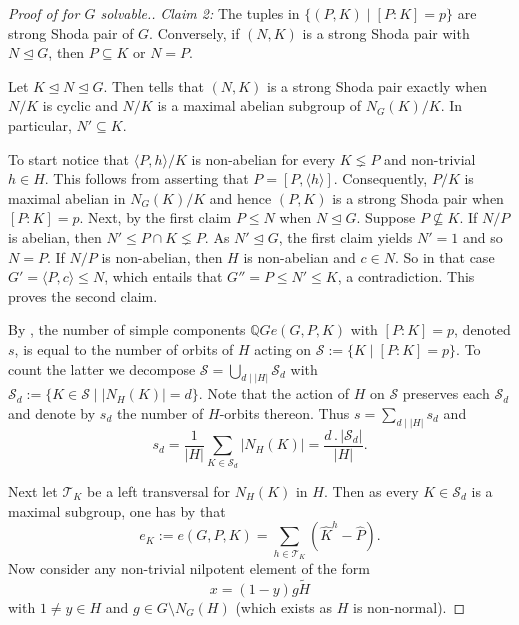 \documentclass[a4paper,10pt]{amsart}
\theoremstyle{definition}
\theoremstyle{remark}
\newcommand{\Q}{{\mathbb Q}}
\begin{document}
\begin{proof}[Proof of  for $G$ solvable.]
{\it Claim 2:} The tuples in $\{ (P, K) \mid [P:K] = p \}$ are strong Shoda pair of $G$. Conversely, if $(N,K)$ is a strong Shoda pair with $N \unlhd G$, then $P \subseteq K$ or $N=P$. \vspace{0,1cm}


\noindent Let $K \unlhd N \unlhd G$. Then \cite[Corollary 3.5.11]{GRG1} tells that $(N,K)$ is a strong Shoda pair exactly when $N/K$ is cyclic and $N/K$ is a maximal abelian subgroup of $N_G(K)/K$. In particular, $N' \subseteq K$. 

\noindent To start notice that $\langle P, h \rangle /K$ is non-abelian for every $K \lneq P$ and non-trivial $h \in H$. This follows from \cite[(24.6), pg 112]{Aschbacher} asserting that  $P = [P, \langle h \rangle]$. Consequently, $P/K$ is maximal abelian in $N_G(K)/K$ and hence $(P,K)$ is a strong Shoda pair when $[P:K]=p$.  Next, by the first claim $P \leq N$ when $N \unlhd G$. Suppose $P \nsubseteq K$. If $N/P$ is abelian, then $N' \leq P \cap K \lneq P$. As $N' \unlhd G$, the first claim yields $N' = 1$ and so $N= P$. If $N/P$ is non-abelian, then $H$ is non-abelian and $c \in N$. So in that case $G' = \langle P, c \rangle  \leq N$, which entails that $G'' = P \leq N' \leq K$, a contradiction. This proves the second claim.

By \cite[Problem 3.4.4.]{GRG1}, the number of simple components $\Q Ge(G,P,K)$ with $[P:K]=p$, denoted $s$, is equal to the number of orbits of $H$ acting on $\mathcal{S} := \{ K \mid  [P:K] = p \}.$ To count the latter we decompose $\mathcal{S} = \bigcup_{d \mid |H|} \mathcal{S}_d$ with $\mathcal{S}_d := \{ K \in \mathcal{S} \mid |N_H(K)|=d \}.$ Note that the action of $H$ on $\mathcal{S}$ preserves each $\mathcal{S}_d$ and denote by $s_d$ the number of $H$-orbits thereon. Thus $s = \sum_{d \mid |H|} s_d$ and 
\begin{equation}\label{formula s_d}
s_d = \frac{1}{|H|}\sum_{K \in \mathcal{S}_d} |N_H(K)| = \frac{d\, .\, |\mathcal{S}_d|}{|H|}.
\end{equation}

Next let $\mathcal{T}_K$ be a left transversal for $N_H(K)$ in $H$. Then as every $K \in \mathcal{S}_d$ is a maximal subgroup, one has by  that 
$$e_K := e(G,P,K) = \sum_{h \in \mathcal{T}_K} (\widehat{K}^h - \widehat{P}).$$
Now consider any non-trivial nilpotent element of the form 
\[x = (1-y) g \widetilde{H}\]
with $1 \neq y \in H$ and $g \in G \setminus N_G(H)$ (which exists as $H$ is non-normal). \vspace{0.1cm}


\end{proof}
\end{document}
